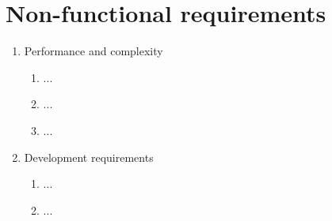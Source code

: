 \section{Non-functional requirements}

\begin{enumerate}
	\item Performance and complexity
	\begin{enumerate}
		\item ...
		\item ...
		\item ...
	\end{enumerate}

	\item Development requirements
	\begin{enumerate}
		\item ...
		\item ...
	\end{enumerate}
\end{enumerate}


